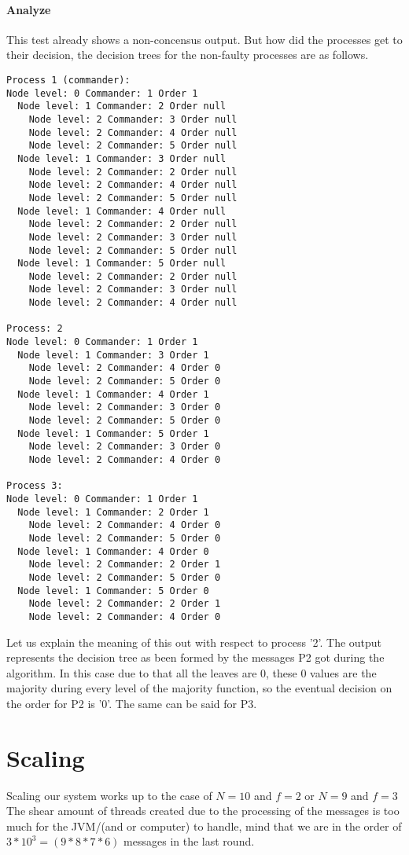 \documentclass{article}
\begin{document}
\paragraph{Analyze}
This test already shows a non-concensus output. But how did the
processes get to their decision, the decision trees for the non-faulty
processes are as follows.
\begin{lstlisting}
Process 1 (commander):
Node level: 0 Commander: 1 Order 1
  Node level: 1 Commander: 2 Order null
    Node level: 2 Commander: 3 Order null
    Node level: 2 Commander: 4 Order null
    Node level: 2 Commander: 5 Order null
  Node level: 1 Commander: 3 Order null
    Node level: 2 Commander: 2 Order null
    Node level: 2 Commander: 4 Order null
    Node level: 2 Commander: 5 Order null
  Node level: 1 Commander: 4 Order null
    Node level: 2 Commander: 2 Order null
    Node level: 2 Commander: 3 Order null
    Node level: 2 Commander: 5 Order null
  Node level: 1 Commander: 5 Order null
    Node level: 2 Commander: 2 Order null
    Node level: 2 Commander: 3 Order null
    Node level: 2 Commander: 4 Order null

Process: 2
Node level: 0 Commander: 1 Order 1
  Node level: 1 Commander: 3 Order 1
    Node level: 2 Commander: 4 Order 0
    Node level: 2 Commander: 5 Order 0
  Node level: 1 Commander: 4 Order 1
    Node level: 2 Commander: 3 Order 0
    Node level: 2 Commander: 5 Order 0
  Node level: 1 Commander: 5 Order 1
    Node level: 2 Commander: 3 Order 0
    Node level: 2 Commander: 4 Order 0

Process 3:
Node level: 0 Commander: 1 Order 1
  Node level: 1 Commander: 2 Order 1
    Node level: 2 Commander: 4 Order 0
    Node level: 2 Commander: 5 Order 0
  Node level: 1 Commander: 4 Order 0
    Node level: 2 Commander: 2 Order 1
    Node level: 2 Commander: 5 Order 0
  Node level: 1 Commander: 5 Order 0
    Node level: 2 Commander: 2 Order 1
    Node level: 2 Commander: 4 Order 0
\end{lstlisting}
Let us explain the meaning of this out with respect to process '2'.
The output represents the decision tree as been formed by the messages
P2 got during the algorithm. In this case due to that all the leaves
are 0, these 0 values are the majority during every level of the
majority function, so the  eventual decision on the order for P2 is '0'.
The same can be said for P3.


\section{Scaling}
Scaling our system works up to the case of $N=10$ and $f=2$ or $N=9$
and $f=3$ The shear amount of threads created due to the processing of
the messages is too much for the JVM/(and or computer) to handle,
mind that we are in the order of $3*10^3 = (9*8*7*6)$ messages in the
last round.
\end{document}
